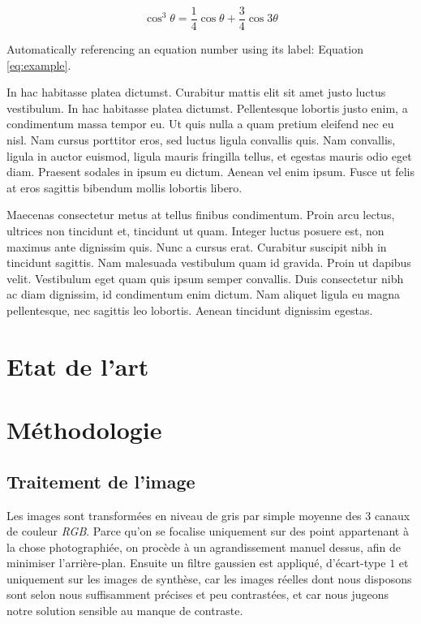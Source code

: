 \documentclass[
	a4paper, %
	10pt, %
	unnumberedsections, %
	twoside, %
]{LTJournalArticle}
\begin{document}
\begin{equation}
	\cos^3 \theta =\frac{1}{4}\cos\theta+\frac{3}{4}\cos 3\theta
	\label{eq:example}
\end{equation}

Automatically referencing an equation number using its label: Equation \ref{eq:example}.

In hac habitasse platea dictumst. Curabitur mattis elit sit amet justo luctus vestibulum. In hac habitasse platea dictumst. Pellentesque lobortis justo enim, a condimentum massa tempor eu. Ut quis nulla a quam pretium eleifend nec eu nisl. Nam cursus porttitor eros, sed luctus ligula convallis quis. Nam convallis, ligula in auctor euismod, ligula mauris fringilla tellus, et egestas mauris odio eget diam. Praesent sodales in ipsum eu dictum. Aenean vel enim ipsum. Fusce ut felis at eros sagittis bibendum mollis lobortis libero.

Maecenas consectetur metus at tellus finibus condimentum. Proin arcu lectus, ultrices non tincidunt et, tincidunt ut quam. Integer luctus posuere est, non maximus ante dignissim quis. Nunc a cursus erat. Curabitur suscipit nibh in tincidunt sagittis. Nam malesuada vestibulum quam id gravida. Proin ut dapibus velit. Vestibulum eget quam quis ipsum semper convallis. Duis consectetur nibh ac diam dignissim, id condimentum enim dictum. Nam aliquet ligula eu magna pellentesque, nec sagittis leo lobortis. Aenean tincidunt dignissim egestas.

\section{Etat de l'art}


\section{Méthodologie}

\subsection{Traitement de l'image}
Les images sont transformées en niveau de gris par simple moyenne des $3$ canaux de couleur \textit{RGB}.
Parce qu'on se focalise uniquement sur des point appartenant à la chose photographiée, on procède
à un agrandissement manuel dessus, afin de minimiser l'arrière-plan. Ensuite un filtre gaussien est
appliqué, d'écart-type $1$ et uniquement sur les images de synthèse, car les images réelles
dont nous disposons sont selon nous suffisamment précises et peu contrastées,
et car nous jugeons notre solution sensible au manque de contraste.
\end{document}
